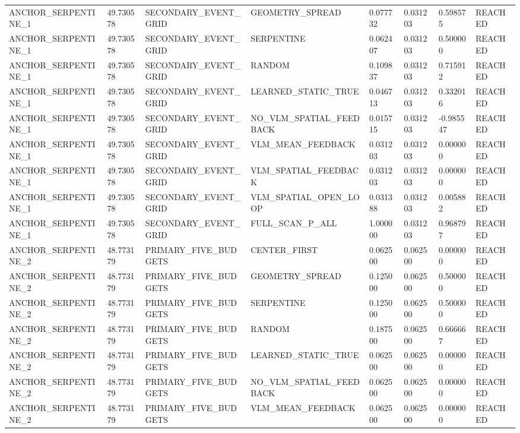 \begin{tabular}{llllllll}
ANCHOR\_SERPENTINE\_1 & 49.730578 & SECONDARY\_EVENT\_GRID & GEOMETRY\_SPREAD & 0.077732 & 0.031203 & 0.598575 & REACHED \\
ANCHOR\_SERPENTINE\_1 & 49.730578 & SECONDARY\_EVENT\_GRID & SERPENTINE & 0.062407 & 0.031203 & 0.500000 & REACHED \\
ANCHOR\_SERPENTINE\_1 & 49.730578 & SECONDARY\_EVENT\_GRID & RANDOM & 0.109837 & 0.031203 & 0.715912 & REACHED \\
ANCHOR\_SERPENTINE\_1 & 49.730578 & SECONDARY\_EVENT\_GRID & LEARNED\_STATIC\_TRUE & 0.046713 & 0.031203 & 0.332016 & REACHED \\
ANCHOR\_SERPENTINE\_1 & 49.730578 & SECONDARY\_EVENT\_GRID & NO\_VLM\_SPATIAL\_FEEDBACK & 0.015715 & 0.031203 & -0.985547 & REACHED \\
ANCHOR\_SERPENTINE\_1 & 49.730578 & SECONDARY\_EVENT\_GRID & VLM\_MEAN\_FEEDBACK & 0.031203 & 0.031203 & 0.000000 & REACHED \\
ANCHOR\_SERPENTINE\_1 & 49.730578 & SECONDARY\_EVENT\_GRID & VLM\_SPATIAL\_FEEDBACK & 0.031203 & 0.031203 & 0.000000 & REACHED \\
ANCHOR\_SERPENTINE\_1 & 49.730578 & SECONDARY\_EVENT\_GRID & VLM\_SPATIAL\_OPEN\_LOOP & 0.031388 & 0.031203 & 0.005882 & REACHED \\
ANCHOR\_SERPENTINE\_1 & 49.730578 & SECONDARY\_EVENT\_GRID & FULL\_SCAN\_P\_ALL & 1.000000 & 0.031203 & 0.968797 & REACHED \\
ANCHOR\_SERPENTINE\_2 & 48.773179 & PRIMARY\_FIVE\_BUDGETS & CENTER\_FIRST & 0.062500 & 0.062500 & 0.000000 & REACHED \\
ANCHOR\_SERPENTINE\_2 & 48.773179 & PRIMARY\_FIVE\_BUDGETS & GEOMETRY\_SPREAD & 0.125000 & 0.062500 & 0.500000 & REACHED \\
ANCHOR\_SERPENTINE\_2 & 48.773179 & PRIMARY\_FIVE\_BUDGETS & SERPENTINE & 0.125000 & 0.062500 & 0.500000 & REACHED \\
ANCHOR\_SERPENTINE\_2 & 48.773179 & PRIMARY\_FIVE\_BUDGETS & RANDOM & 0.187500 & 0.062500 & 0.666667 & REACHED \\
ANCHOR\_SERPENTINE\_2 & 48.773179 & PRIMARY\_FIVE\_BUDGETS & LEARNED\_STATIC\_TRUE & 0.062500 & 0.062500 & 0.000000 & REACHED \\
ANCHOR\_SERPENTINE\_2 & 48.773179 & PRIMARY\_FIVE\_BUDGETS & NO\_VLM\_SPATIAL\_FEEDBACK & 0.062500 & 0.062500 & 0.000000 & REACHED \\
ANCHOR\_SERPENTINE\_2 & 48.773179 & PRIMARY\_FIVE\_BUDGETS & VLM\_MEAN\_FEEDBACK & 0.062500 & 0.062500 & 0.000000 & REACHED \\

\end{tabular}
